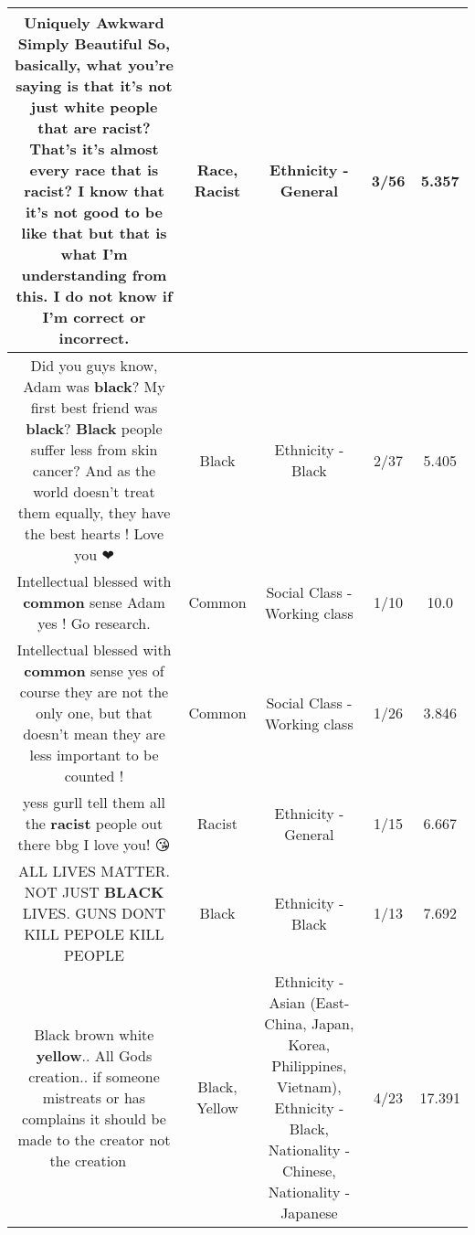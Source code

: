 \documentclass[11pt]{article}
\newlength\mylength
\begin{document}
\begin{center}
\begin{longtable}{|C{.65\mylength}|C{.30\mylength}|C{.12\mylength}|C{.12\mylength}|C{.12\mylength}|}
  \small Uniquely    Awkward Simply    Beautiful So, basically, what you're saying is that it's not just white people that are \textbf{racist}? That's it's almost every \textbf{race} that is \textbf{racist}? I know that it's not good to be like that but that is what I'm understanding from this. I do not know if I'm correct or incorrect.\normalsize   & Race, Racist & Ethnicity - General & 3/56 & 5.357 \\  \hline
  \small Did you guys know, Adam was \textbf{black}? My first best friend was \textbf{black}? \textbf{Black} people suffer less from skin cancer? And as the world doesn't treat them equally, they have the best hearts ! Love you ❤\normalsize   & Black & Ethnicity - Black & 2/37 & 5.405 \\  \hline
  \small Intellectual blessed with \textbf{common} sense Adam yes ! Go research.\normalsize   & Common & Social Class - Working class & 1/10 & 10.0 \\  \hline
  \small Intellectual blessed with \textbf{common} sense yes of course they are not the only one, but that doesn't mean they are less important to be counted !\normalsize   & Common & Social Class - Working class & 1/26 & 3.846 \\  \hline
  \small yess gurll tell them all the \textbf{racist} people out there bbg I love you! 😘\normalsize   & Racist & Ethnicity - General & 1/15 & 6.667 \\  \hline
  \small ALL LIVES MATTER.  NOT JUST \textbf{BLACK} LIVES. GUNS DONT KILL PEPOLE KILL PEOPLE\normalsize   & Black & Ethnicity - Black & 1/13 & 7.692 \\  \hline
  \small Black brown white \textbf{y\textbf{e\textbf{llow}}}.. All Gods creation.. if someone mistreats or has complains it should be made to the creator not the creation🤷🏻‍♀️\normalsize   & Black, Yellow & Ethnicity - Asian (East- China, Japan, Korea, Philippines, Vietnam), Ethnicity - Black, Nationality - Chinese, Nationality - Japanese & 4/23 & 17.391 \\  \hline

\end{longtable}
\end{center}
\end{document}
